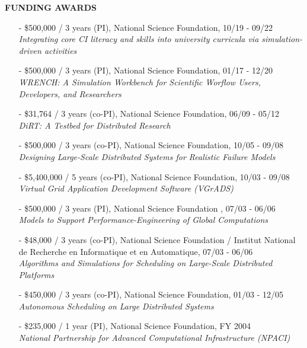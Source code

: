 \documentclass[times,11pt]{letter}
\begin{document}
\noindent
{\large{\bf FUNDING AWARDS}}
\begin{itemize}


\item[-] \$500,000 / 3 years (PI), National Science Foundation, 10/19 - 09/22~\\
    {\it Integrating core CI literacy and skills into university curricula via simulation-driven activities}


\item[-] \$500,000 / 3 years (PI), National Science Foundation, 01/17 - 12/20~\\
{\it WRENCH: A Simulation Workbench for Scientific Worflow Users, Developers, and Researchers}

\item[-] \$31,764 / 3 years (co-PI), National Science Foundation, 06/09 - 05/12~\\
{\it DiRT: A Testbed for Distributed Research}

\item[-] \$500,000 / 3 years (co-PI), National Science Foundation, 10/05 - 09/08~\\
{\it Designing Large-Scale Distributed Systems for Realistic Failure Models}

\item[-] \$5,400,000 / 5 years (co-PI), National Science Foundation, 10/03 - 09/08~\\
        {\it Virtual Grid Application Development Software (VGrADS)}

\item[-] \$500,000 / 3 years (PI), National Science Foundation , 07/03 - 06/06~\\
	{\it Models to Support Performance-Engineering of Global Computations}

\item[-] \$48,000 / 3 years (co-PI), National Science Foundation / Institut National de Recherche en Informatique et en Automatique, 07/03 - 06/06~\\
	{\it Algorithms and Simulations for Scheduling on Large-Scale Distributed Platforms}


\item[-] \$450,000 / 3 years (co-PI), National Science Foundation, 01/03 - 12/05~\\
	{\it Autonomous Scheduling on Large Distributed Systems}

\item[-] \$235,000 / 1 year (PI), National Science Foundation, FY 2004~\\
      \emph{National Partnership for Advanced Computational Infrastructure (NPACI)}



\end{itemize}
\end{document}
